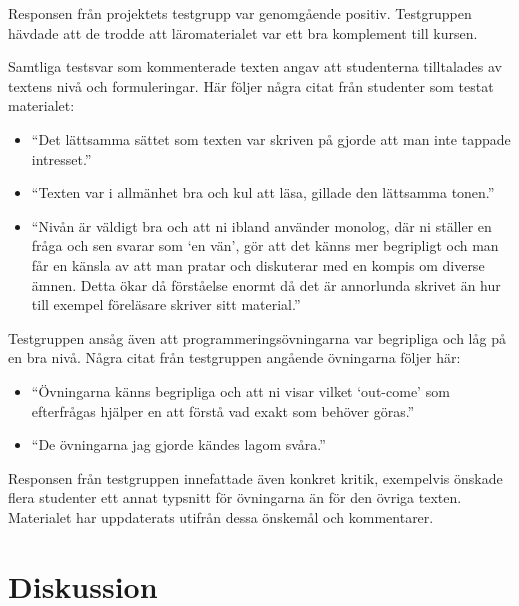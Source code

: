 \documentclass[]{article}
\begin{document}
Responsen från projektets testgrupp var genomgående positiv. Testgruppen hävdade att de trodde att läromaterialet var
ett bra komplement till kursen.

Samtliga testsvar som kommenterade texten angav att studenterna tilltalades av textens nivå och formuleringar. Här
följer några citat från studenter som testat materialet:
\begin{itemize}
  \item ``Det lättsamma sättet som texten var skriven på gjorde att man inte tappade intresset.''
  \item ``Texten var i allmänhet bra och kul att läsa, gillade den lättsamma tonen.''
  \item ``Nivån är väldigt bra och att ni ibland använder monolog, där ni ställer en fråga och sen svarar som `en vän',
  gör att det känns mer begripligt och man får en känsla av att man pratar och diskuterar med en kompis om diverse ämnen.
  Detta ökar då förståelse enormt då det är annorlunda skrivet än hur till exempel föreläsare skriver sitt material.''
\end{itemize}

Testgruppen ansåg även att programmeringsövningarna var begripliga och låg på en bra nivå. Några citat från testgruppen
angående övningarna följer här:
\begin{itemize}
  \item ``Övningarna känns begripliga och att ni visar vilket `out-come' som efterfrågas hjälper en att förstå vad
  exakt som behöver göras.''
  \item ``De övningarna jag gjorde kändes lagom svåra.''
  \end{itemize}

Responsen från testgruppen innefattade även konkret kritik, exempelvis önskade flera studenter ett annat typsnitt för
övningarna än för den övriga texten. Materialet har uppdaterats utifrån dessa önskemål och kommentarer.

\section{Diskussion}

\end{document}
